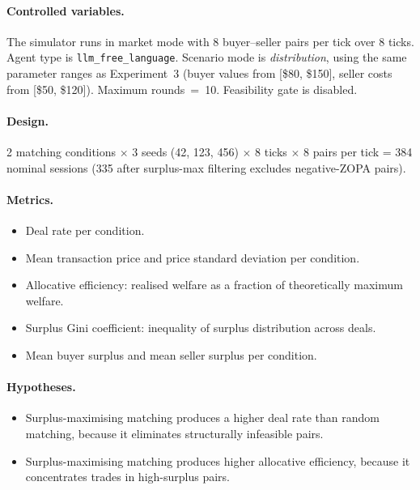 \paragraph{Controlled variables.}
The simulator runs in market mode with 8 buyer--seller pairs per tick over 8 ticks.  Agent type is \texttt{llm\_free\_language}.  Scenario mode is \emph{distribution}, using the same parameter ranges as Experiment~3 (buyer values from [\$80, \$150], seller costs from [\$50, \$120]).  Maximum rounds~=~10.  Feasibility gate is disabled.

\paragraph{Design.}
2 matching conditions $\times$ 3 seeds (42, 123, 456) $\times$ 8 ticks $\times$ 8 pairs per tick = 384 nominal sessions (335 after surplus-max filtering excludes negative-ZOPA pairs).

\paragraph{Metrics.}
\begin{itemize}
    \item Deal rate per condition.
    \item Mean transaction price and price standard deviation per condition.
    \item Allocative efficiency: realised welfare as a fraction of theoretically maximum welfare.
    \item Surplus Gini coefficient: inequality of surplus distribution across deals.
    \item Mean buyer surplus and mean seller surplus per condition.
\end{itemize}

\paragraph{Hypotheses.}
\begin{itemize}
    \item[\textbf{H-5a.}] Surplus-maximising matching produces a higher deal rate than random matching, because it eliminates structurally infeasible pairs.
    \item[\textbf{H-5b.}] Surplus-maximising matching produces higher allocative efficiency, because it concentrates trades in high-surplus pairs.
\end{itemize}


